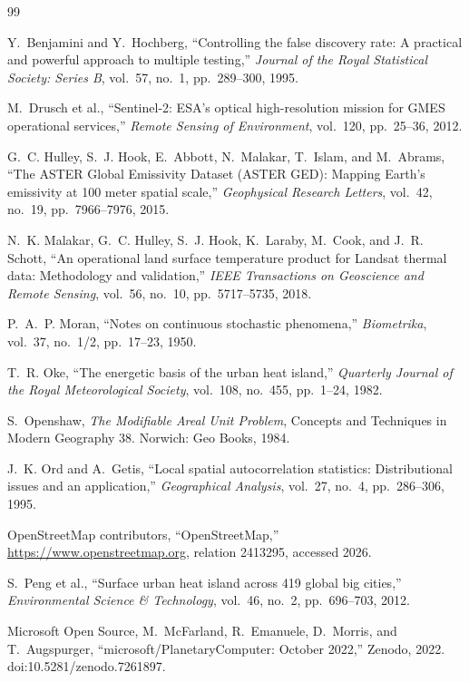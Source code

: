 \documentclass[11pt,a4paper]{article}
\begin{document}
\begin{thebibliography}{99}
\small

 Y.~Benjamini and Y.~Hochberg, ``Controlling the false discovery rate: A practical and powerful approach to multiple testing,'' \emph{Journal of the Royal Statistical Society: Series B}, vol.~57, no.~1, pp.~289--300, 1995.

 M.~Drusch et al., ``Sentinel-2: ESA's optical high-resolution mission for GMES operational services,'' \emph{Remote Sensing of Environment}, vol.~120, pp.~25--36, 2012.

 G.~C. Hulley, S.~J. Hook, E.~Abbott, N.~Malakar, T.~Islam, and M.~Abrams, ``The ASTER Global Emissivity Dataset (ASTER GED): Mapping Earth's emissivity at 100 meter spatial scale,'' \emph{Geophysical Research Letters}, vol.~42, no.~19, pp.~7966--7976, 2015.

 N.~K. Malakar, G.~C. Hulley, S.~J. Hook, K.~Laraby, M.~Cook, and J.~R. Schott, ``An operational land surface temperature product for Landsat thermal data: Methodology and validation,'' \emph{IEEE Transactions on Geoscience and Remote Sensing}, vol.~56, no.~10, pp.~5717--5735, 2018.

 P.~A.~P. Moran, ``Notes on continuous stochastic phenomena,'' \emph{Biometrika}, vol.~37, no.~1/2, pp.~17--23, 1950.

 T.~R. Oke, ``The energetic basis of the urban heat island,'' \emph{Quarterly Journal of the Royal Meteorological Society}, vol.~108, no.~455, pp.~1--24, 1982.

 S.~Openshaw, \emph{The Modifiable Areal Unit Problem}, Concepts and Techniques in Modern Geography 38. Norwich: Geo Books, 1984.

 J.~K. Ord and A.~Getis, ``Local spatial autocorrelation statistics: Distributional issues and an application,'' \emph{Geographical Analysis}, vol.~27, no.~4, pp.~286--306, 1995.

 OpenStreetMap contributors, ``OpenStreetMap,'' \url{https://www.openstreetmap.org}, relation 2413295, accessed 2026.

 S.~Peng et al., ``Surface urban heat island across 419 global big cities,'' \emph{Environmental Science \& Technology}, vol.~46, no.~2, pp.~696--703, 2012.

 Microsoft Open Source, M.~McFarland, R.~Emanuele, D.~Morris, and T.~Augspurger, ``microsoft/PlanetaryComputer: October 2022,'' Zenodo, 2022. doi:10.5281/zenodo.7261897.


\end{thebibliography}
\end{document}
